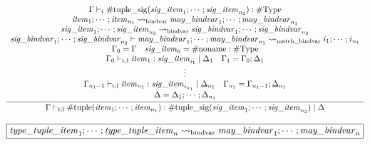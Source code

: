 \begin{gather*}
    \infer{\Gamma \vdash_{\mathrm{t}; \mathrm{l}} \mathrm{\#tuple}(\mathit{item}_1; \cdots; \mathit{item}_{n_1}): \mathrm{\#tuple\_sig}(\mathit{sig\_item}_1; \cdots; \mathit{sig\_item}_{n_2}) \mid \Delta}{
        \begin{array}{c}
            \Gamma \vdash_\mathrm{t} \mathrm{\#tuple\_sig}(\mathit{sig\_item}_1; \cdots; \mathit{sig\_item}_{n_2}): \mathrm{\#Type}
            \\
            \mathit{item}_1; \cdots; \mathit{item}_{n_1} \rightsquigarrow_\mathrm{bindvar} \mathit{may\_bindvar}_1; \cdots; \mathit{may\_bindvar}_{n_1}
            \\
            \mathit{sig\_item}_1; \cdots; \mathit{sig\_item}_{n_2} \rightsquigarrow_\mathrm{bindvar} \mathit{sig\_bindvar}_1; \cdots; \mathit{sig\_bindvar}_{n_2}
            \\
            \mathit{sig\_bindvar}_1; \cdots; \mathit{sig\_bindvar}_{n_2} \vdash \mathit{may\_bindvar}_1; \cdots; \mathit{may\_bindvar}_{n_1} \rightsquigarrow_\mathrm{match\_bindvar} i_1; \cdots; i_{n_1}
            \\
            \Gamma_0 = \Gamma
            \hspace{1em}
            \mathit{sig\_item}_0 = \mathrm{\#noname}: \mathrm{\#Type}
            \\
            \Gamma_0 \vdash_{\mathrm{t}; \mathrm{l}} \mathit{item}_1: \mathit{sig\_item}_{i_1} \mid \Delta_1
            \hspace{1em}
            \Gamma_1 = \Gamma_0; \Delta_1
            \\
            \vdots
            \\
            \Gamma_{n_1 - 1} \vdash_{\mathrm{t}; \mathrm{l}} \mathit{item}_{n_1}: \mathit{sig\_item}_{i_{n_1}} \mid \Delta_{n_1}
            \hspace{1em}
            \Gamma_{n_1} = \Gamma_{n_1 - 1}; \Delta_{n_1}
            \\
            \Delta = \Delta_1; \cdots; \Delta_{n_1}
        \end{array}
    }
\end{gather*}

$\fbox{$\mathit{type\_tuple\_item}_1; \cdots; \mathit{type\_tuple\_item}_n \rightsquigarrow_\mathrm{bindvar} \mathit{may\_bindvar}_1; \cdots; \mathit{may\_bindvar}_n$}$

